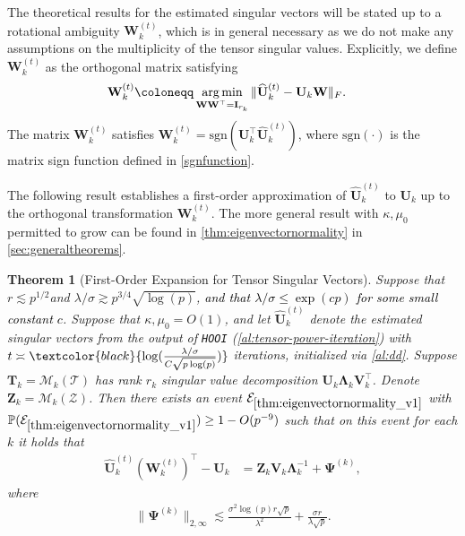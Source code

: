 \documentclass[10pt]{article}
\newcommand{\0}{{\mathbf{0}}}
\newcommand{\1}{{\mathbf{1}}}
\newcommand{\U}{{\mathbf{U}}}
\newcommand{\argmin}{\mathop{\rm arg\min}}
\renewcommand{\t}{^{\top}}
\newcommand{\uhat}{\mathbf{\hat{U}}}
\newtheorem{theorem}{Theorem}
\newcommand{\p}{\mathbb{P}}
\newcommand{\inv}{^{-1}}
\renewcommand{\hat}{\widehat}
\renewcommand{\hat}{\widehat}
\begin{document}

The theoretical results for the estimated singular vectors will be stated up to a rotational ambiguity $\mathbf{W}_k^{(t)}$, which is in general necessary as we do not make any assumptions on the multiplicity of the tensor singular values. Explicitly, we define $\mathbf{W}_k^{(t)}$ as the orthogonal matrix satisfying
\begin{align*}
    \mathbf{W}_k^{(t)} &\coloneqq \argmin_{\mathbf{WW}\t = \mathbf{I}_{r_k}} \| \uhat_k^{(t)} - \U_k \mathbf{W} \|_F.
\end{align*}
The matrix $\mathbf{W}_k^{(t)}$ satisfies $\mathbf{W}_k^{(t)} = \mathrm{sgn}( \U_k\t \uhat_k^{(t)} )$, where $\mathrm{sgn}(\cdot)$ is the matrix sign function defined in \eqref{sgnfunction}.


The following result establishes a first-order approximation of $\uhat_k^{(t)}$ to $\U_k$ up to the  orthogonal transformation $\mathbf{W}_k^{(t)}$.  The more general result with $\kappa, \mu_0$ permitted to grow can be found in \cref{thm:eigenvectornormality} in \cref{sec:generaltheorems}. 

\begin{theorem}[First-Order Expansion for Tensor Singular Vectors] \label{thm:eigenvectornormality_v1}
Suppose that $r \lesssim p^{1/2} $and $\lambda/\sigma \gtrsim p^{3/4} \sqrt{\log(p)}$, \textcolor{black}{and that $\lambda/\sigma \leq \exp(c p)$ for some small constant $c$}. Suppose that $\kappa,\mu_0 = O(1)$, and let $\uhat_k^{(t)}$ denote the estimated singular vectors from the output of \texttt{HOOI} (\cref{al:tensor-power-iteration}) with $t \asymp \textcolor{black}{\log( \frac{\lambda/\sigma}{C \sqrt{p\log(p)}})} $%
iterations, initialized via \cref{al:dd}.  Suppose $\mathbf{T}_k = \mathcal{M}_k(\mathcal{T})$ has rank $r_k$ singular value decomposition $\U_k \mathbf{\Lambda}_k \mathbf{V}_k\t$.  Denote $\mathbf{Z}_k = \mathcal{M}_k(\mathcal{Z})$.  Then there exists an event  $\mathcal{E}_{\mathrm{\cref{thm:eigenvectornormality_v1}}}$ with $\p(\mathcal{E}_{\mathrm{\cref{thm:eigenvectornormality_v1}}}) \geq 1 - O(p^{-9})$ such that on this event for each $k$ it holds that
\begin{align*}
    \uhat_k^{(t)} (\mathbf{W}_k^{(t)})\t - \U_k &=\mathbf{Z}_k \mathbf{V}_k \mathbf{\Lambda}_k\inv + \mathbf{\Psi}^{(k)},
\end{align*}
where
\begin{align*}
    \| \mathbf{\Psi}^{(k)} \|_{2,\infty} \lesssim \frac{\sigma^2 \log(p) r \sqrt{p}}{\lambda^2} + \frac{\sigma r}{\lambda \sqrt{p}}.
\end{align*}
\end{theorem}
\end{document}
